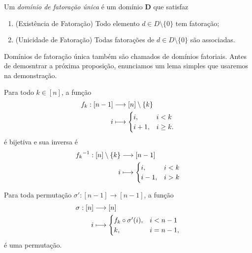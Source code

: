 \begin{defi}
Um \emph{domínio de fatoração única} é um domínio $\bm D$ que satisfaz
	\begin{enumerate}
	\item (Existência de Fatoração) Todo elemento $d \in D \setminus \{0\}$ tem fatoração;
	\item (Unicidade de Fatoração) Todas fatorações de $d \in D \setminus \{0\}$ são associadas.
	\end{enumerate}
\end{defi}

Domínios de fatoração única também são chamados de domínios fatoriais. Antes de demosntrar a próxima proposição, enunciamos um lema simples que usaremos na demonstração.

\begin{lema}
\label{conj:prop:permut.tranlad}
Para todo $k \in [n]$, a função
	\begin{align*}
	{f_k}: {[n-1]} &\longrightarrow {[n]\setminus\{k\}} \\{i} &\longmapsto {\begin{cases}
		i,& i < k \\
		i+1,& i \geq k.
		\end{cases}}
	\end{align*}
é bijetiva e sua inversa é
	\begin{align*}
	{{f_k}^{-1}}: {[n]\setminus\{k\}} &\longrightarrow {[n-1]} \\{i} &\longmapsto {\begin{cases}
		i,& i < k \\
		i-1,& i > k
		\end{cases}}
	\end{align*}

Para toda permutação $\sigma'\colon [n-1] \to [n-1]$, a função
	\begin{align*}
	{\sigma}: {[n]} &\longrightarrow {[n]} \\{i} &\longmapsto {\begin{cases}
		f_k \circ \sigma' (i), & i < n-1 \\
		k, & i = n-1,
		\end{cases}}
	\end{align*}
é uma permutação.
\end{lema}
